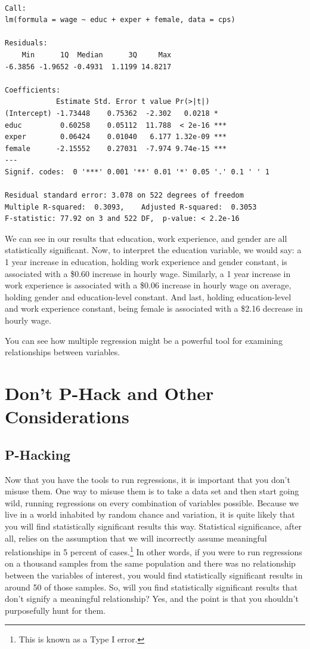 \documentclass[
  letterpaper,
]{book}
\begin{document}
\begin{verbatim}

Call:
lm(formula = wage ~ educ + exper + female, data = cps)

Residuals:
    Min      1Q  Median      3Q     Max 
-6.3856 -1.9652 -0.4931  1.1199 14.8217 

Coefficients:
            Estimate Std. Error t value Pr(>|t|)    
(Intercept) -1.73448    0.75362  -2.302   0.0218 *  
educ         0.60258    0.05112  11.788  < 2e-16 ***
exper        0.06424    0.01040   6.177 1.32e-09 ***
female      -2.15552    0.27031  -7.974 9.74e-15 ***
---
Signif. codes:  0 '***' 0.001 '**' 0.01 '*' 0.05 '.' 0.1 ' ' 1

Residual standard error: 3.078 on 522 degrees of freedom
Multiple R-squared:  0.3093,    Adjusted R-squared:  0.3053 
F-statistic: 77.92 on 3 and 522 DF,  p-value: < 2.2e-16
\end{verbatim}

We can see in our results that education, work experience, and gender
are all statistically significant. Now, to interpret the education
variable, we would say: a 1 year increase in education, holding work
experience and gender constant, is associated with a \$0.60 increase in
hourly wage. Similarly, a 1 year increase in work experience is
associated with a \$0.06 increase in hourly wage on average, holding
gender and education-level constant. And last, holding education-level
and work experience constant, being female is associated with a \$2.16
decrease in hourly wage.

You can see how multiple regression might be a powerful tool for
examining relationships between variables.

\hypertarget{dont-p-hack-and-other-considerations}{%
\section{Don't P-Hack and Other
Considerations}\label{dont-p-hack-and-other-considerations}}

\hypertarget{p-hacking}{%
\subsection{P-Hacking}\label{p-hacking}}

Now that you have the tools to run regressions, it is important that you
don't misuse them. One way to misuse them is to take a data set and then
start going wild, running regressions on every combination of variables
possible. Because we live in a world inhabited by random chance and
variation, it is quite likely that you will find statistically
significant results this way. Statistical significance, after all,
relies on the assumption that we will incorrectly assume meaningful
relationships in 5 percent of cases.\footnote{This is known as a Type I
  error.} In other words, if you were to run regressions on a thousand
samples from the same population and there was no relationship between
the variables of interest, you would find statistically significant
results in around 50 of those samples. So, will you find statistically
significant results that don't signify a meaningful relationship? Yes,
and the point is that you shouldn't purposefully hunt for them.
\end{document}
